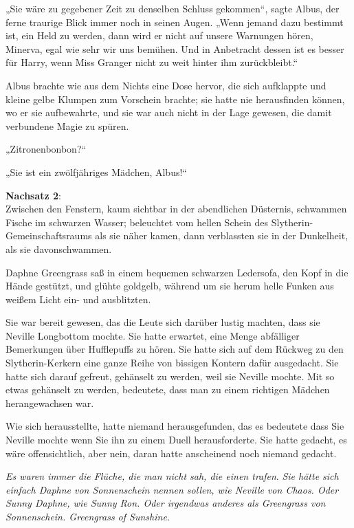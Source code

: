 {„Sie wäre zu gegebener Zeit zu denselben Schluss gekommen“, sagte Albus, der ferne traurige Blick immer noch in seinen Augen. „Wenn jemand dazu bestimmt ist, ein Held zu werden, dann wird er nicht auf unsere Warnungen hören, Minerva, egal wie sehr wir uns bemühen. Und in Anbetracht dessen ist es besser für Harry, wenn Miss Granger nicht zu weit hinter ihm zurückbleibt.“

Albus brachte wie aus dem Nichts eine Dose hervor, die sich aufklappte und kleine gelbe Klumpen zum Vorschein brachte; sie hatte nie herausfinden können, wo er sie aufbewahrte, und sie war auch nicht in der Lage gewesen, die damit verbundene Magie zu spüren.

„Zitronenbonbon?“

„Sie ist ein zwölfjähriges Mädchen, Albus!“

\textbf{Nachsatz 2}:\\ Zwischen den Fenstern, kaum sichtbar in der abendlichen Düsternis, schwammen Fische im schwarzen Wasser; beleuchtet vom hellen Schein des Slytherin-Gemeinschaftsraums als sie näher kamen, dann verblassten sie in der Dunkelheit, als sie davonschwammen.

Daphne Greengrass saß in einem bequemen schwarzen Ledersofa, den Kopf in die Hände gestützt, und glühte goldgelb, während um sie herum helle Funken aus weißem Licht ein- und ausblitzten.

Sie war bereit gewesen, das die Leute sich darüber lustig machten, dass sie Neville Longbottom mochte. Sie hatte erwartet, eine Menge abfälliger Bemerkungen über Hufflepuffs zu hören. Sie hatte sich auf dem Rückweg zu den Slytherin-Kerkern eine ganze Reihe von bissigen Kontern dafür ausgedacht. Sie hatte sich darauf gefreut, gehänselt zu werden, weil sie Neville mochte. Mit so etwas gehänselt zu werden, bedeutete, dass man zu einem richtigen Mädchen herangewachsen war.

Wie sich herausstellte, hatte niemand herausgefunden, das es bedeutete dass Sie Neville mochte wenn Sie ihn zu einem Duell herausforderte. Sie hatte gedacht, es wäre offensichtlich, aber nein, daran hatte anscheinend noch niemand gedacht.

\emph{Es waren immer die Flüche, die man nicht sah, die einen trafen}. \emph{Sie hätte sich einfach Daphne von Sonnenschein nennen sollen, wie Neville von Chaos. Oder Sunny Daphne, wie Sunny Ron. Oder irgendwas anderes als Greengrass von Sonnenschein. Greengrass of Sunshine.}

}
